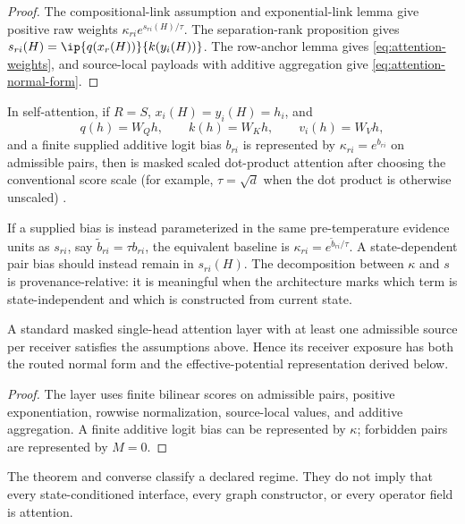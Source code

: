 \begin{proof}
The compositional-link assumption and exponential-link lemma give positive raw weights $\kappa_{ri}e^{s_{ri}(H)/\tau}$. The separation-rank proposition gives $s_{ri}(H)=\ip{q(x_r(H))}{k(y_i(H))}$. The row-anchor lemma gives \eqref{eq:attention-weights}, and source-local payloads with additive aggregation give \eqref{eq:attention-normal-form}.
\end{proof}

\begin{corollary}\label{cor:standard-attention}
In self-attention, if $R=S$, $x_i(H)=y_i(H)=h_i$, and
\[
q(h)=W_Qh,
\qquad
k(h)=W_Kh,
\qquad
v_i(h)=W_Vh,
\]
and a finite supplied additive logit bias $b_{ri}$ is represented by $\kappa_{ri}=e^{b_{ri}}$ on admissible pairs, then  is masked scaled dot-product attention after choosing the conventional score scale (for example, $\tau=\sqrt d$ when the dot product is otherwise unscaled) \citep{vaswani2017attention}.
\end{corollary}

If a supplied bias is instead parameterized in the same pre-temperature evidence units as $s_{ri}$, say $\widetilde b_{ri}=\tau b_{ri}$, the equivalent baseline is $\kappa_{ri}=e^{\widetilde b_{ri}/\tau}$. A state-dependent pair bias should instead remain in $s_{ri}(H)$. The decomposition between $\kappa$ and $s$ is provenance-relative: it is meaningful when the architecture marks which term is state-independent and which is constructed from current state.

\begin{proposition}\label{prop:attention-converse}
A standard masked single-head attention layer with at least one admissible source per receiver satisfies the assumptions above. Hence its receiver exposure has both the routed normal form and the effective-potential representation derived below.
\end{proposition}

\begin{proof}
The layer uses finite bilinear scores on admissible pairs, positive exponentiation, rowwise normalization, source-local values, and additive aggregation. A finite additive logit bias can be represented by $\kappa$; forbidden pairs are represented by $M=0$.
\end{proof}

The theorem and converse classify a declared regime. They do not imply that every state-conditioned interface, every graph constructor, or every operator field is attention.

